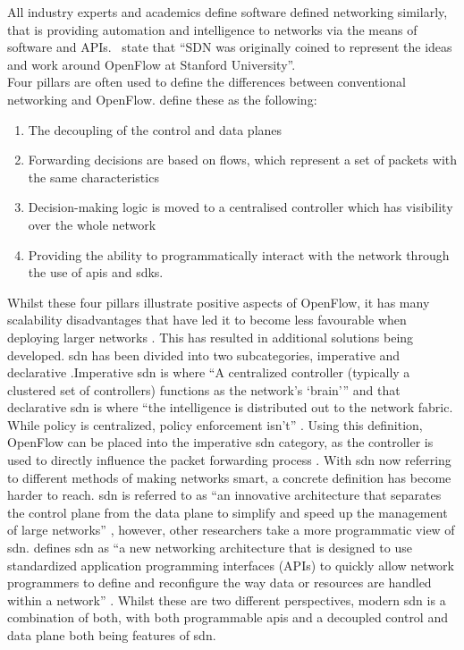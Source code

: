 All industry experts and academics define
software defined networking
similarly, that is providing automation and
intelligence to networks via the
means of software and APIs.~\citet{11} state
that ``SDN was originally coined
to represent the ideas and work around
OpenFlow at Stanford University''.\\
Four pillars are often used to define the differences between conventional
networking and OpenFlow. \citet{11} define these as the
following:
\begin{enumerate}
      \item The decoupling of the control and data planes
      \item Forwarding decisions are based on flows, which represent a set of packets with the same characteristics
      \item Decision-making logic is moved to a centralised controller which has visibility over the whole network
      \item Providing the ability to programmatically interact with the network through the use of \gls{api}s and \gls{sdk}s.
\end{enumerate}

Whilst these four pillars illustrate positive aspects of OpenFlow, it has many scalability disadvantages that have led it to become less favourable when deploying larger networks \citep{8784036}. This has resulted in additional
solutions being developed. \gls{sdn} has been divided into two subcategories, imperative and declarative \citep{10}.Imperative \gls{sdn} is where ``A centralized controller (typically a clustered set of controllers) functions as
the network’s ‘brain’'' \citep{10} and that declarative \gls{sdn} is where ``the intelligence is distributed out to the network fabric. While policy is centralized, policy enforcement isn’t'' \citep{10}. Using this definition,
OpenFlow can be placed into the imperative \gls{sdn} category, as the controller is used to directly influence the packet forwarding process \citep{11}. With \gls{sdn} now referring to different methods of making networks smart, a concrete definition has become harder to reach. \gls{sdn} is referred to as ``an innovative architecture that separates the control plane from the data plane to simplify and speed up the management of large networks'' \citep{app11156999}, however, other researchers take a more programmatic view of \gls{sdn}. \citeauthor{9} defines \gls{sdn} as  ``a new networking architecture that is designed to use standardized application programming interfaces (APIs) to quickly allow network programmers to define and reconfigure the way data or resources are handled within a network'' \citep{9}. Whilst these are two different perspectives, modern \gls{sdn} is a combination of both, with both programmable \gls{api}s and a decoupled control and data plane both being features of \gls{sdn}.

